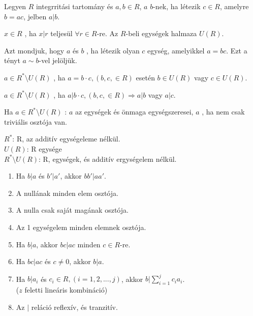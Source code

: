 \begin{frame}
  \begin{tcolorbox}[title={Oszthatóság egységelemes integritási tarományban (Emlékeztető)}]
    Legyen $R$ integrritási tartomány és $a, b \in R$, $a$  $b$-nek, ha létezik $c \in R$, amelyre $b = ac$, jelben $a | b$.\\
    \mmedskip

    $x \in R$ , ha $x | r$ teljesül ${\forall}r \in R$-re. Az $R$-beli egységek halmaza $U(R)$.\\
    \mmedskip

    Azt mondjuk, hogy $a$ és $b$ , ha létezik olyan $c$ egység, amelyikkel $a = bc$. Ezt a tényt $a \sim b$-vel jelöljük.\\
    \mmedskip

    $a \in R^*{\setminus}U(R)$ , ha $a = b \cdot c, (b, c, \in R)$ esetén $b \in U(R)$ vagy $c \in U(R)$.\\
    \mmedskip

    $a \in R^*{\setminus}U(R)$ , ha $a | b \cdot c, (b, c, \in R) \Rightarrow a | b$ vagy $a | c$.\\
    \mmedskip

    Ha $a \in R^*{\setminus}U(R)$ : $a$  az egységek és önmaga egységszeresei, $a$ , ha nem csak triviális osztója van.\\
    \mmedskip

    $R^*$: R, az additív egységeleme nélkül.\\
    $U(R)$: R egysége\\
    $R^*{\setminus}U(R)$: R, egységek, és additív ergységelem nélkül.
  \end{tcolorbox}
\end{frame}

\begin{frame}
\begin{tcolorbox}[title={Tétel: Az oszthatóság tulajdonságai EIT-ban}]
\begin{enumerate}
\item Ha $b|a$ és $b'|a'$, akkor $bb'|aa'$.
\item A nullának minden elem osztója.
\item A nulla csak saját magának osztója.
\item Az 1 egységelem minden elemnek osztója.
\item Ha $b|a$, akkor $bc|ac$ minden $c \in R$-re.
\item Ha $bc|ac$ és $c \neq 0$, akkor $b|a$.
\item Ha $b|a_i$ és $c_i \in R, (i = 1, 2, ..., j)$, akkor $b|\sum^j_{i=1} c_ia_i$.\\
($z$ feletti lineáris kombináció)
\item Az $|$ reláció reflexív, és tranzitív.
\end{enumerate}
\end{tcolorbox}
\end{frame}

